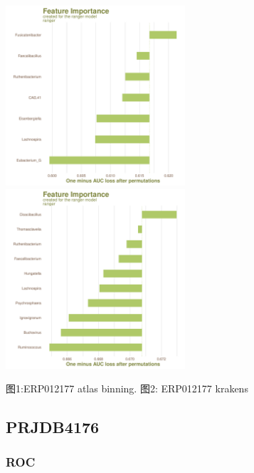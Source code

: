 \documentclass[
]{article}
\begin{document}
\includegraphics[width=0.5\textwidth,height=0.5\textheight]{../../Analysis_shotgun_ERP012177/03_ML/shotgun/atlas_binning/ERP012177_binning_best.model_draw_feature_importance_plot.pdf}
\includegraphics[width=0.5\textwidth,height=0.5\textheight]{../../Analysis_shotgun_ERP012177/03_ML/shotgun/krakens/ERP012177_best.model_draw_feature_importance_plot.pdf}

图1:ERP012177 atlas binning. 图2: ERP012177 krakens

\hypertarget{prjdb4176}{%
\subsection{PRJDB4176}\label{prjdb4176}}

\hypertarget{roc-1}{%
\subsubsection{ROC}\label{roc-1}}
\end{document}

